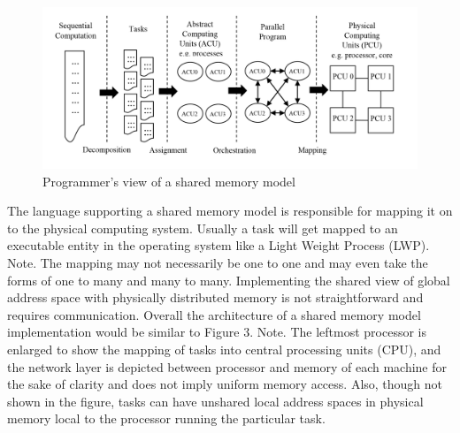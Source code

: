 \begin{figure}
\centering
\includegraphics[width=0.9\columnwidth]{figures/fig_parallel_decompose}
\caption{Programmer’s view of a shared memory model}
\label{fig:fig_parallel_decompose}
\end{figure}


The language supporting a shared memory model is responsible for mapping it on to the physical computing system. Usually a task will get mapped to an executable entity in the operating system like a Light Weight Process (LWP). Note. The mapping may not necessarily be one to one and may even take the forms of one to many and many to many. Implementing the shared view of global address space with physically distributed memory is not straightforward and requires communication. Overall the architecture of a shared memory model implementation would be similar to Figure 3. Note. The leftmost processor is enlarged to show the mapping of tasks into central processing units (CPU), and the network layer is depicted between processor and memory of each machine for the sake of clarity and does not imply uniform memory access. Also, though not shown in the figure, tasks can have unshared local address spaces in physical memory local to the processor running the particular task.
 
